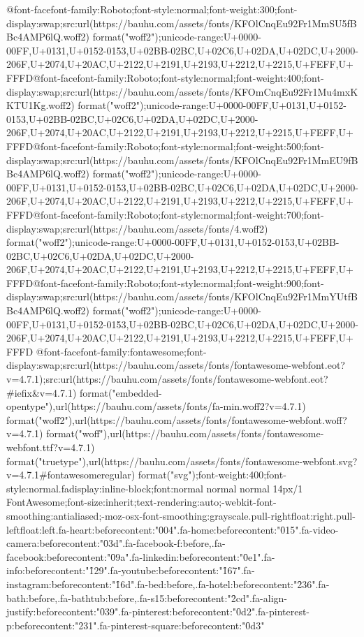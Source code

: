 {@font-face{font-family:Roboto;font-style:normal;font-weight:300;font-display:swap;src:url(https://bauhu.com/assets/fonts/KFOlCnqEu92Fr1MmSU5fBBc4AMP6lQ.woff2) format("woff2");unicode-range:U+0000-00FF,U+0131,U+0152-0153,U+02BB-02BC,U+02C6,U+02DA,U+02DC,U+2000-206F,U+2074,U+20AC,U+2122,U+2191,U+2193,U+2212,U+2215,U+FEFF,U+FFFD}@font-face{font-family:Roboto;font-style:normal;font-weight:400;font-display:swap;src:url(https://bauhu.com/assets/fonts/KFOmCnqEu92Fr1Mu4mxKKTU1Kg.woff2) format("woff2");unicode-range:U+0000-00FF,U+0131,U+0152-0153,U+02BB-02BC,U+02C6,U+02DA,U+02DC,U+2000-206F,U+2074,U+20AC,U+2122,U+2191,U+2193,U+2212,U+2215,U+FEFF,U+FFFD}@font-face{font-family:Roboto;font-style:normal;font-weight:500;font-display:swap;src:url(https://bauhu.com/assets/fonts/KFOlCnqEu92Fr1MmEU9fBBc4AMP6lQ.woff2) format("woff2");unicode-range:U+0000-00FF,U+0131,U+0152-0153,U+02BB-02BC,U+02C6,U+02DA,U+02DC,U+2000-206F,U+2074,U+20AC,U+2122,U+2191,U+2193,U+2212,U+2215,U+FEFF,U+FFFD}@font-face{font-family:Roboto;font-style:normal;font-weight:700;font-display:swap;src:url(https://bauhu.com/assets/fonts/4.woff2) format("woff2");unicode-range:U+0000-00FF,U+0131,U+0152-0153,U+02BB-02BC,U+02C6,U+02DA,U+02DC,U+2000-206F,U+2074,U+20AC,U+2122,U+2191,U+2193,U+2212,U+2215,U+FEFF,U+FFFD}@font-face{font-family:Roboto;font-style:normal;font-weight:900;font-display:swap;src:url(https://bauhu.com/assets/fonts/KFOlCnqEu92Fr1MmYUtfBBc4AMP6lQ.woff2) format("woff2");unicode-range:U+0000-00FF,U+0131,U+0152-0153,U+02BB-02BC,U+02C6,U+02DA,U+02DC,U+2000-206F,U+2074,U+20AC,U+2122,U+2191,U+2193,U+2212,U+2215,U+FEFF,U+FFFD}
@font-face{font-family:fontawesome;font-display:swap;src:url(https://bauhu.com/assets/fonts/fontawesome-webfont.eot?v=4.7.1);src:url(https://bauhu.com/assets/fonts/fontawesome-webfont.eot?#iefix&v=4.7.1) format("embedded-opentype"),url(https://bauhu.com/assets/fonts/fa-min.woff2?v=4.7.1) format("woff2"),url(https://bauhu.com/assets/fonts/fontawesome-webfont.woff?v=4.7.1) format("woff"),url(https://bauhu.com/assets/fonts/fontawesome-webfont.ttf?v=4.7.1) format("truetype"),url(https://bauhu.com/assets/fonts/fontawesome-webfont.svg?v=4.7.1#fontawesomeregular) format("svg");font-weight:400;font-style:normal}.fa{display:inline-block;font:normal normal normal 14px/1 FontAwesome;font-size:inherit;text-rendering:auto;-webkit-font-smoothing:antialiased;-moz-osx-font-smoothing:grayscale}.pull-right{float:right}.pull-left{float:left}.fa-heart:before{content:"\f004"}.fa-home:before{content:"\f015"}.fa-video-camera:before{content:"\f03d"}.fa-facebook-f:before,.fa-facebook:before{content:"\f09a"}.fa-linkedin:before{content:"\f0e1"}.fa-info:before{content:"\f129"}.fa-youtube:before{content:"\f167"}.fa-instagram:before{content:"\f16d"}.fa-bed:before,.fa-hotel:before{content:"\f236"}.fa-bath:before,.fa-bathtub:before,.fa-s15:before{content:"\f2cd"}.fa-align-justify:before{content:"\f039"}.fa-pinterest:before{content:"\f0d2"}.fa-pinterest-p:before{content:"\f231"}.fa-pinterest-square:before{content:"\f0d3"}
}
